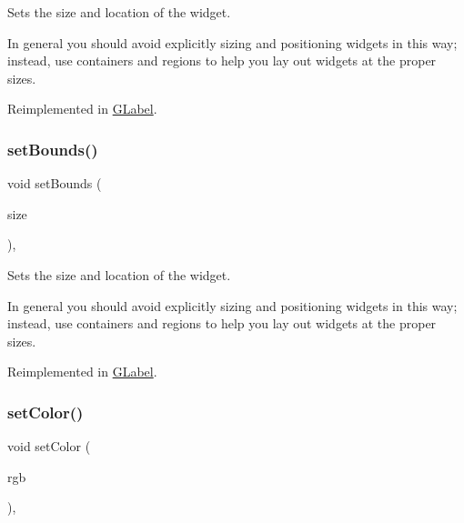 Sets the size and location of the widget. 

In general you should avoid explicitly sizing and positioning widgets in this way; instead, use containers and regions to help you lay out widgets at the proper sizes. 

Reimplemented in \mbox{\hyperlink{classGLabel_aab3121dc97f8c5c1ddee39ea81d08509}{G\+Label}}.

\mbox{\label{classGInteractor_acada386653f008cacc7cce86426bef7c}} 
\subsubsection{\texorpdfstring{set\+Bounds()}{setBounds()}\hspace{0.1cm}{\footnotesize\ttfamily [2/2]}}
{\footnotesize\ttfamily void set\+Bounds (\begin{DoxyParamCaption}\item[{const \mbox{\hyperlink{classGRectangle}{G\+Rectangle}} \&}]{size }\end{DoxyParamCaption})\hspace{0.3cm}{\ttfamily [virtual]}, {\ttfamily [inherited]}}



Sets the size and location of the widget. 

In general you should avoid explicitly sizing and positioning widgets in this way; instead, use containers and regions to help you lay out widgets at the proper sizes. 

Reimplemented in \mbox{\hyperlink{classGLabel_a3ed96c7e7adaf111848a90978621066c}{G\+Label}}.

\mbox{\label{classGInteractor_ab1f5cc0f5cc6bbbd716a526c61f1081d}} 
\subsubsection{\texorpdfstring{set\+Color()}{setColor()}\hspace{0.1cm}{\footnotesize\ttfamily [1/2]}}
{\footnotesize\ttfamily void set\+Color (\begin{DoxyParamCaption}\item[{int}]{rgb }\end{DoxyParamCaption})\hspace{0.3cm}{\ttfamily [virtual]}, {\ttfamily [inherited]}}




